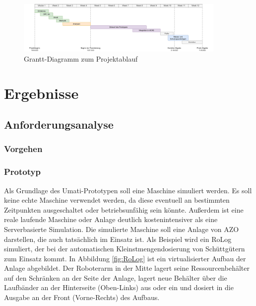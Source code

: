 \documentclass[a4paper, 12pt, oneside]{scrbook}
\begin{document}
	\begin{figure}[H]
		\centering
		\includegraphics[width=0.9\textwidth]{res/analysen/Grantt-Diagramm.pdf}
		\caption{Grantt-Diagramm zum Projektablauf}
		\label{fig:Grantt}
	\end{figure}
	
	
\chapter{Ergebnisse}\label{ch:Ergebnisse}
	
	
	\section{Anforderungsanalyse}
	
		\subsection{Vorgehen}
		
		
		\subsection{Prototyp}
		Als Grundlage des Umati-Prototypen soll eine Maschine simuliert werden. Es soll keine echte Maschine verwendet werden, da diese eventuell an bestimmten Zeitpunkten ausgeschaltet oder betriebsunfähig sein könnte. Außerdem ist eine reale laufende Maschine oder Anlage deutlich kostenintensiver als eine Serverbasierte Simulation. Die simulierte Maschine soll eine Anlage von AZO darstellen, die auch tatsächlich im Einsatz ist. Als Beispiel wird ein RoLog simuliert, der bei der automatischen Kleinstmengendosierung von Schüttgütern zum Einsatz kommt. In Abbildung \ref{fig:RoLog} ist ein virtualisierter Aufbau der Anlage abgebildet. Der Roboterarm in der Mitte lagert seine Ressourcenbehälter auf den Schränken an der Seite der Anlage, lagert neue Behälter über die Laufbänder an der Hinterseite (Oben-Links) aus oder ein und dosiert in die Ausgabe an der Front (Vorne-Rechts) des Aufbaus. \cite{noauthor_azo_nodate}
		
\end{document}
